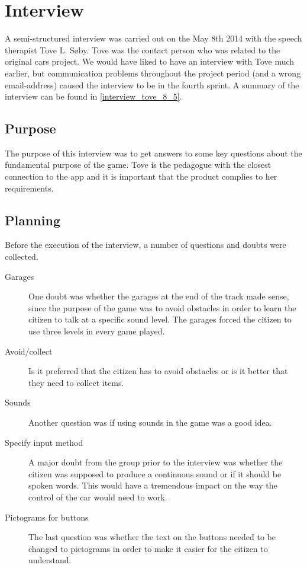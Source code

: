 \section{Interview}\label{s4_interview}

A semi-structured interview \cite{deb} was carried out on the May 8th 2014 with the speech therapist Tove L. Søby.
Tove was the contact person who was related to the original cars project.\cite{oldcars}
We would have liked to have an interview with Tove much earlier, but communication problems throughout the project period (and a wrong email-address) caused the interview to be in the fourth sprint.
A summary of the interview can be found in \cref{interview_tove_8_5}.

\subsection{Purpose}
The purpose of this interview was to get answers to some key questions about the fundamental purpose of the game. 
Tove is the pedagogue with the closest connection to the app and it is important that the product complies to her requirements.

\subsection{Planning}
Before the execution of the interview, a number of questions and doubts were collected.

\begin{description}
\item[Garages] One doubt was whether the garages at the end of the track made sense, since the purpose of the game was to avoid obstacles in order to learn the citizen to talk at a specific sound level.
The garages forced the citizen to use three levels in every game played.

\item[Avoid/collect] Is it preferred that the citizen has to avoid obstacles or is it better that they need to collect items. 

\item[Sounds] Another question was if using sounds in the game was a good idea.

\item[Specify input method] A major doubt from the group prior to the interview was whether the citizen was supposed to produce a continuous sound or if it should be spoken words.
This would have a tremendous impact on the way the control of the car would need to work.

\item[Pictograms for buttons] The last question was whether the text on the buttons needed to be changed to pictograms in order to make it easier for the citizen to understand.
\end{description}

